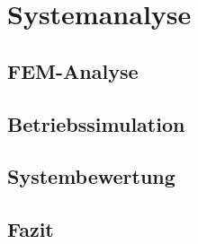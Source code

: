 \chapter{Systemanalyse}


\section{FEM-Analyse}

\section{Betriebssimulation}

\section{Systembewertung}

\section{Fazit}